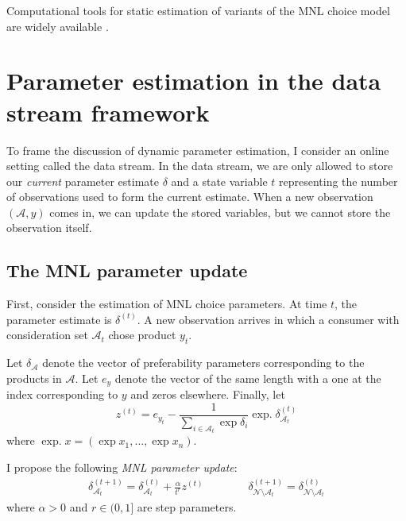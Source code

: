\documentclass[preprint,12pt,authoryear]{elsarticle}
\DeclareMathOperator*{\expd}{exp.}
\begin{document}
Computational tools for static estimation of variants of the MNL choice model are widely available \cite[][]{croissantnd}. 

\section{Parameter estimation in the data stream framework}
To frame the discussion of dynamic parameter estimation, I consider an online setting called the data stream. In the data stream, we are only allowed to store our \emph{current} parameter estimate $\delta$ and a state variable $t$ representing the number of observations used to form the current estimate. When a new observation $(\mathcal{A}, y)$ comes in, we can update the stored variables, but we cannot store the observation itself. %

\subsection{The MNL parameter update}
First, consider the estimation of MNL choice parameters. At time $t$, the parameter estimate is $\delta^{(t)}$. A new observation arrives in which a consumer with consideration set $\mathcal{A}_t$ chose product $y_t$. 

Let $\delta_{\mathcal{A}}$ denote the vector of preferability parameters corresponding to the products in $\mathcal{A}$. Let $e_{y}$ denote the vector of the same length with a one at the index corresponding to $y$ and zeros elsewhere. Finally, let
\begin{equation}z^{(t)} = e_{y_t} -  \frac{1}{\sum_{i\in \mathcal{A}_t} \exp \delta_i} \expd \delta^{(t)}_{\mathcal{A}_t}\end{equation}
where $\expd x = (\exp x_1, \dots, \exp x_n)$.

I propose the following \emph{MNL parameter update}:
\begin{align} \label{mnlparameterupdate}
\delta^{(t+1)}_{\mathcal{A}_t} = \delta^{(t)}_{\mathcal{A}_t} + \frac{\alpha}{t^r} z^{(t)} \qquad\qquad
\delta^{(t+1)}_{\mathcal{N} \setminus \mathcal{A}_t} = \delta^{(t)}_{\mathcal{N} \setminus \mathcal{A}_t}
\end{align}
where $\alpha >0$ and $r \in (0, 1]$ are step parameters.
\end{document}
